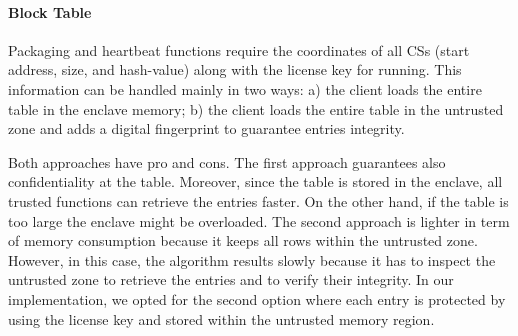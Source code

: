 \paragraph{\textbf{Block Table}}
Packaging and heartbeat functions require the coordinates of all 
CSs (start address, size, and hash-value) along with the license key
for running.
This information can be handled mainly in two ways:
a) the client loads the entire table in the enclave memory;
b) the client loads the entire table in the untrusted zone and adds a digital 
fingerprint to guarantee entries integrity.

Both approaches have pro and cons. The first approach guarantees also 
confidentiality
at the table.
Moreover, since the table is stored in the enclave, all trusted functions can
retrieve the entries faster.
On the other hand, if the table is too large the enclave might be overloaded.
The second approach is lighter in term of memory consumption because it keeps 
all
rows within the untrusted zone. However, in this case, the algorithm results 
slowly because it has to
inspect the untrusted zone to retrieve the entries and to verify
their integrity.
In our implementation, we opted for the second option where each entry is 
protected
by using the license key and stored within the untrusted memory region.


